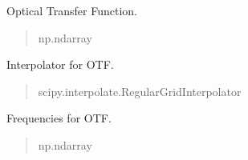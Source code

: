 \documentclass[letterpaper,10pt,english]{sphinxmanual}
\begin{document}
\begin{fulllineitems}
\begin{fulllineitems}
\label{\detokenize{source/OpticalSystems:OpticalSystems.OpticalSystem.otf}}
\pysigstartsignatures
\pysigline
{}
\pysigstopsignatures
\sphinxAtStartPar
Optical Transfer Function.
\begin{quote}\begin{description}
\sphinxAtStartPar
np.ndarray

\end{description}\end{quote}

\end{fulllineitems}


\begin{fulllineitems}
\label{\detokenize{source/OpticalSystems:OpticalSystems.OpticalSystem.interpolator}}
\pysigstartsignatures
\pysigline
{}
\pysigstopsignatures
\sphinxAtStartPar
Interpolator for OTF.
\begin{quote}\begin{description}
\sphinxAtStartPar
scipy.interpolate.RegularGridInterpolator

\end{description}\end{quote}

\end{fulllineitems}


\begin{fulllineitems}
\label{\detokenize{source/OpticalSystems:OpticalSystems.OpticalSystem._otf_frequencies}}
\pysigstartsignatures
\pysigline
{}
\pysigstopsignatures
\sphinxAtStartPar
Frequencies for OTF.
\begin{quote}\begin{description}
\sphinxAtStartPar
np.ndarray

\end{description}\end{quote}

\end{fulllineitems}


\end{fulllineitems}
\end{document}
